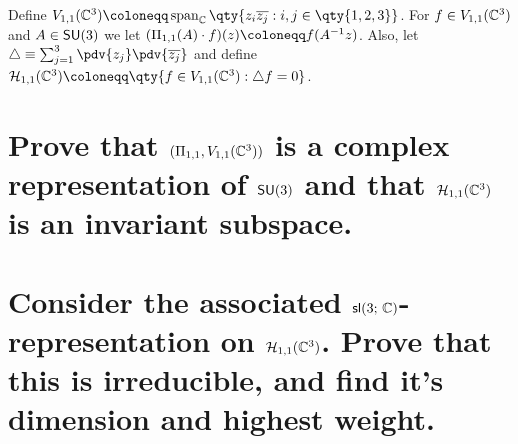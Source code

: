 \documentclass[
	pages,
	boxes,
	color=WildStrawberry
]{homework}
\theoremstyle{plain}
\begin{document}
\begin{problem}
Define $V_{1, 1}(\C^3)\defeq \vspan_\C\qty{z_i\overline{z_j} : i, j\in\qty{1,2,3}}$. For $f\in V_{1,1}(\mathbb{C}^3)$ and $A\in \mathsf{SU}(3)$ we let $(\Pi_{1,1}(A)\cdot f)(z)\defeq f(A^{-1}z)$. Also, let $\laplace \equiv \sum_{j = 1}^3 \pdv{z_j}\pdv{\overline{z_j}}$ and define $\mathcal{H}_{1,1}(\C^3)\defeq \qty{f\in V_{1, 1}(\C^3) : \laplace{f} = 0}$.
\begin{parts}
	\part{Prove that $(\Pi_{1,1}, V_{1,1}(\mathbb{C}^3))$ is a complex representation of $\mathsf{SU}(3)$ and that $\mathcal{H}_{1,1}(\mathbb{C}^3)$ is an invariant subspace.}\label{part:4a}
	\part{Consider the associated $\mathsf{sl}(3;\, \mathbb{C})$-representation on $\mathcal{H}_{1,1}(\mathbb{C}^3)$. Prove that this is irreducible, and find it's dimension and highest weight.}\label{part:4b}
\end{parts}
\end{problem}
\end{document}
